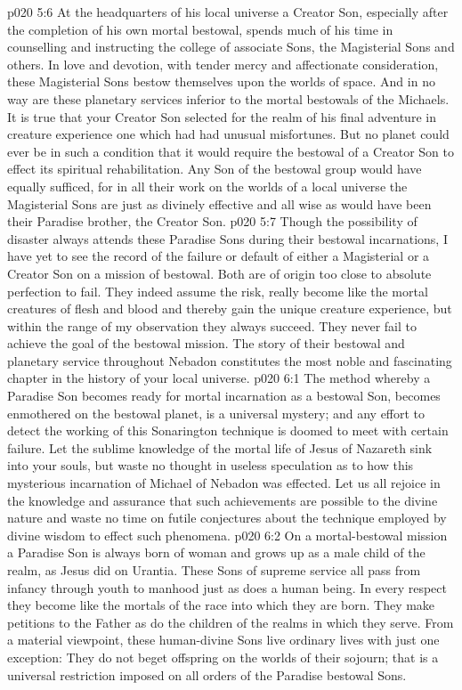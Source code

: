 \vs p020 5:6 At the headquarters of his local universe a Creator Son, especially after the completion of his own mortal bestowal, spends much of his time in counselling and instructing the college of associate Sons, the Magisterial Sons and others. In love and devotion, with tender mercy and affectionate consideration, these Magisterial Sons bestow themselves upon the worlds of space. And in no way are these planetary services inferior to the mortal bestowals of the Michaels. It is true that your Creator Son selected for the realm of his final adventure in creature experience one which had had unusual misfortunes. But no planet could ever be in such a condition that it would require the bestowal of a Creator Son to effect its spiritual rehabilitation. Any Son of the bestowal group would have equally sufficed, for in all their work on the worlds of a local universe the Magisterial Sons are just as divinely effective and all wise as would have been their Paradise brother, the Creator Son.
\vs p020 5:7 \pc Though the possibility of disaster always attends these Paradise Sons during their bestowal incarnations, I have yet to see the record of the failure or default of either a Magisterial or a Creator Son on a mission of bestowal. Both are of origin too close to absolute perfection to fail. They indeed assume the risk, really become like the mortal creatures of flesh and blood and thereby gain the unique creature experience, but within the range of my observation they always succeed. They never fail to achieve the goal of the bestowal mission. The story of their bestowal and planetary service throughout Nebadon constitutes the most noble and fascinating chapter in the history of your local universe.
\vs p020 6:1 The method whereby a Paradise Son becomes ready for mortal incarnation as a bestowal Son, becomes enmothered on the bestowal planet, is a universal mystery; and any effort to detect the working of this Sonarington technique is doomed to meet with certain failure. Let the sublime knowledge of the mortal life of Jesus of Nazareth sink into your souls, but waste no thought in useless speculation as to how this mysterious incarnation of Michael of Nebadon was effected. Let us all rejoice in the knowledge and assurance that such achievements are possible to the divine nature and waste no time on futile conjectures about the technique employed by divine wisdom to effect such phenomena.
\vs p020 6:2 \pc On a mortal\hyp{}bestowal mission a Paradise Son is always born of woman and grows up as a male child of the realm, as Jesus did on Urantia. These Sons of supreme service all pass from infancy through youth to manhood just as does a human being. In every respect they become like the mortals of the race into which they are born. They make petitions to the Father as do the children of the realms in which they serve. From a material viewpoint, these human\hyp{}divine Sons live ordinary lives with just one exception: They do not beget offspring on the worlds of their sojourn; that is a universal restriction imposed on all orders of the Paradise bestowal Sons.
